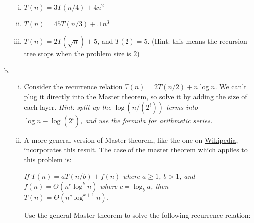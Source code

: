 \begin{qunlist}
\begin{enumerate}[(a)]
\begin{enumerate}[(i)]
\item $T(n) = 3T(n/4) + 4n^2$\\
\item $T(n) = 45T(n/3) + .1n^3$\\
\item $T(n) = 2T(\sqrt{n}) + 5$, and $T(2) = 5$. (Hint: this means the recursion tree stops when the problem size is $2$)\\
\end{enumerate}
\item
\begin{enumerate}[(i)]
\item Consider the recurrence relation $T(n) = 2T(n/2) + n \log n$. We can't plug it directly into the Master theorem, so solve it by adding the size of each layer.
\textit{Hint: split up the $\log (n/(2^i))$ terms into $\log n - \log (2^i)$, and use the formula for arithmetic series.}\\


\item A more general version of Master theorem, like the one on \href{https://en.wikipedia.org/wiki/Master_theorem}{Wikipedia}, incorporates this result. The case of the master theorem which applies to this problem is:

\textit{If $T(n) = aT(n/b) + f(n)$ where $a \geq 1$, $b > 1$, and $f(n) = \Theta(n^c \log^k n)$ where $c = \log_b a$, then $T(n) = \Theta(n^c \log^{k+1} n)$. }

Use the general Master theorem to solve the following recurrence relation:


\end{enumerate}
\end{enumerate}
\end{qunlist}
